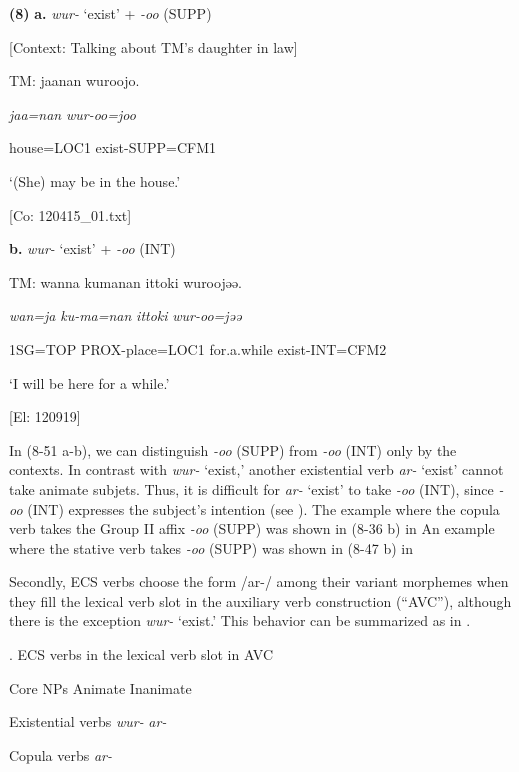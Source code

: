 \textbf{(8)}  \textbf{a.}  \textit{wur-} ‘exist’ + \textit{{}-oo} (SUPP)

    [Context: Talking about TM’s daughter in law]

    TM:  jaanan  wuroojo.

      \textit{jaa=nan}  \textit{wur-oo=joo}

      house=LOC1  exist-SUPP=CFM1

      ‘(She) may be in the house.’

      [Co: 120415\_01.txt]

  \textbf{b.}  \textit{wur-} ‘exist’ + \textit{{}-oo} (INT)

    TM:  wanna  kumanan  {\textbar}ittoki{\textbar}  wuroojəə.

      \textit{wan=ja}  \textit{ku-ma=nan}  \textit{ittoki}  \textit{wur-oo=jəə}

      1SG=TOP  PROX-place=LOC1  for.a.while  exist-INT=CFM2

      ‘I will be here for a while.’

      [El: 120919]

In (8-51 a-b), we can distinguish \textit{{}-oo} (SUPP) from \textit{{}-oo} (INT) only by the contexts. In contrast with \textit{wur-} ‘exist,’ another existential verb \textit{ar-} ‘exist’ cannot take animate subjets. Thus, it is difficult for \textit{ar{}-} ‘exist’ to take \textit{{}-oo} (INT), since \textit{{}-oo} (INT) expresses the subject’s intention (see ). The example where the copula verb takes the Group II affix \textit{{}-oo} (SUPP) was shown in (8-36 b) in  An example where the stative verb takes \textit{{}-oo} (SUPP) was shown in (8-47 b) in 

  Secondly, ECS verbs choose the form /ar-/ among their variant morphemes when they fill the lexical verb slot in the auxiliary verb construction (“AVC”), although there is the exception \textit{wur-} ‘exist.’ This behavior can be summarized as in .

\begin{styleBeschriftung}
\textmd{}\textmd{. ECS verbs in the lexical verb slot in AVC}
\end{styleBeschriftung}

Core NPs  Animate  Inanimate

Existential verbs  \textit{wur-}  \textit{ar-}

Copula verbs  \textit{ar-}

